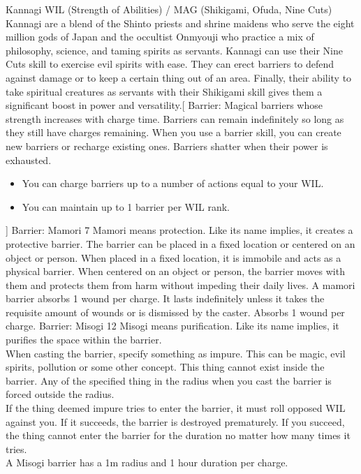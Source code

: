 ﻿\begin{path}
{Kannagi}
{WIL (Strength of Abilities) / MAG (Shikigami, Ofuda, Nine Cuts)}
{Kannagi are a blend of the Shinto priests and shrine maidens who serve the eight million gods of Japan and the occultist Onmyouji who practice a mix of philosophy, science, and taming spirits as servants.}
{Kannagi can use their Nine Cuts skill to exercise evil spirits with ease. They can erect barriers to defend against damage or to keep a certain thing out of an area. Finally, their ability to take spiritual creatures as servants with their Shikigami skill gives them a significant boost in power and versatility.}[
Barrier:
Magical barriers whose strength increases with charge time. Barriers can remain indefinitely so long as they still have charges remaining. When you use a barrier skill, you can create new barriers or recharge existing ones. Barriers shatter when their power is exhausted.
\begin{itemize}
\item You can charge barriers up to a number of actions equal to your WIL.
\item You can maintain up to 1 barrier per WIL rank.
\end{itemize}]
\skilldescription
{Barrier: Mamori}
{7}
{Mamori means protection. Like its name implies, it creates a protective barrier. The barrier can be placed in a fixed location or centered on an object or person. When placed in a fixed location, it is immobile and acts as a physical barrier. When centered on an object or person, the barrier moves with them and protects them from harm without impeding their daily lives. A mamori barrier absorbs 1 wound per charge. It lasts indefinitely unless it takes the requisite amount of wounds or is dismissed by the caster.}
{Absorbs 1 wound per charge.}
\skilldescription
{Barrier: Misogi}
{12}
{Misogi means purification. Like its name implies, it purifies the space within the barrier.
\\When casting the barrier, specify something as impure. This can be magic, evil spirits, pollution or some other concept. This thing cannot exist inside the barrier. Any of the specified thing in the radius when you cast the barrier is forced outside the radius.
\\If the thing deemed impure tries to enter the barrier, it must roll opposed WIL against you. If it succeeds, the barrier is destroyed prematurely. If you succeed, the thing cannot enter the barrier for the duration no matter how many times it tries.
\\A Misogi barrier has a 1m radius and 1 hour duration per charge.}

\end{path}
